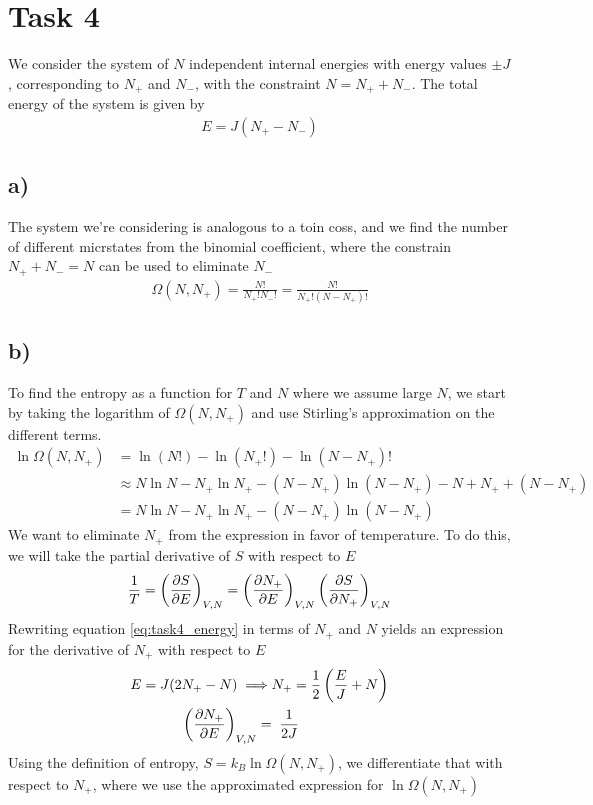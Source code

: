 \documentclass[reprint,english,notitlepage,aps,nobalancelastpage,nofootinbib]{revtex4-1}
\newcommand{\closed}[1]{\left(#1\right)}
\newcommand{\tmdv}[4]{\closed{\pdv{#1}{#2}}_{#3,#4}}
\newcommand{\np}{N_+}
\newcommand{\kb}{k_B}
\begin{document}
\clearpage
\section*{\large Task 4}
We consider the system of $N$ independent internal energies with energy values $\pm J$, corresponding to $\np$ and $N_-$, with the constraint $N=\np + N_-$. The total energy of the system is given by
\begin{align} \label{eq:task4_energy}
	E=J(\np-N_-)
\end{align}

\subsection*{a)}
The system we're considering is analogous to a toin coss, and we find the number of different micrstates from the binomial coefficient, where the constrain $\np+N_-=N$ can be used to eliminate $N_-$
\begin{align*}
	\Omega(N,\np) = \frac{N!}{\np!N_-!}=\frac{N!}{\np!(N-\np)!}
\end{align*}


\subsection*{b)}
To find the entropy as a function for $T$ and $N$ where we assume large $N$, we start by taking the logarithm of $\Omega(N,\np)$ and use Stirling's approximation on the different terms. 
\begin{align*}
	\ln\Omega(N,\np) &= \ln(N!) - \ln(\np!)-\ln(N-\np)! \\ 
	&\approx N\ln N - \np \ln\np - (N-\np)\ln(N-\np) - N + \np + (N-\np) \\
	&=N\ln N - \np \ln\np - (N-\np)\ln(N-\np)
\end{align*}
We want to eliminate $\np$ from the expression in favor of temperature. To do this, we will take the partial derivative of $S$ with respect to $E$
\begin{align*}
	\frac{1}{T}=\tmdv{S}{E}{V}{N}=\tmdv{\np}{E}{V}{N}\tmdv{S}{\np}{V}{N}
\end{align*}
Rewriting equation \eqref{eq:task4_energy} in terms of $\np$ and $N$ yields an expression for the derivative of $\np$ with respect to $E$
\begin{align*}
	E = J(2\np-N) \implies& \np = \frac{1}{2}\closed{\frac{E}{J}+N} \\ 
	\tmdv{\np}{E}{V}{N} =&\;\; \frac{1}{2J}
\end{align*}
Using the definition of entropy, $S = \kb \ln\Omega(N,\np)$, we differentiate that with respect to $\np$, where we use the approximated expression for $\ln\Omega(N,\np)$
\end{document}
